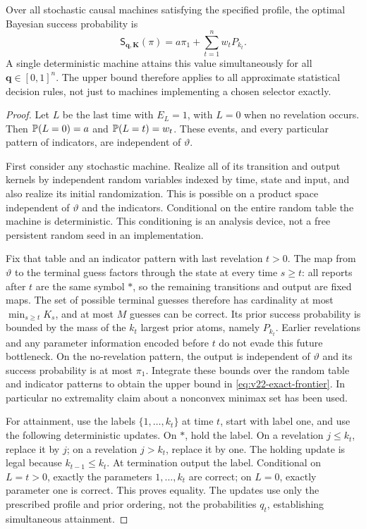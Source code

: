 \begin{theorem}
\label{thm:v22-revelation}
Over all stochastic causal machines satisfying the specified profile,
the optimal Bayesian success probability is
\begin{equation}\label{eq:v22-exact-frontier}
 \mathsf S_{\boldsymbol q,\boldsymbol K}(\pi)
       =a\pi_1+\sum_{t=1}^n w_tP_{k_t}.
\end{equation}
A single deterministic machine attains this value simultaneously for
all $\boldsymbol q\in[0,1]^n$. The upper bound therefore applies to
all approximate statistical decision rules, not just to machines
implementing a chosen selector exactly.
\end{theorem}
\begin{proof}
Let $L$ be the last time with $E_L=1$, with $L=0$ when no revelation
occurs. Then $\mathbb P(L=0)=a$ and $\mathbb P(L=t)=w_t$. These events, and every
particular pattern of indicators, are independent of $\vartheta$.

First consider any stochastic machine. Realize all of its transition
and output kernels by independent random variables indexed by time,
state and input, and also realize its initial randomization. This is
possible on a product space independent of $\vartheta$ and the
indicators. Conditional on the entire random table the machine is
deterministic. This conditioning is an analysis device, not a free
persistent random seed in an implementation.

Fix that table and an indicator pattern with last revelation $t>0$.
The map from $\vartheta$ to the terminal guess factors through the
state at every time $s\ge t$: all reports after $t$ are the same
symbol $*$, so the remaining transitions and output are fixed maps.
The set of possible terminal guesses therefore has cardinality at
most $\min_{s\ge t}K_s$, and at most $M$ guesses can be correct.
Its prior success probability is bounded by the mass of the $k_t$
largest prior atoms, namely $P_{k_t}$. Earlier revelations and any
parameter information encoded before $t$ do not evade this future
bottleneck. On the no-revelation pattern, the output is independent of
$\vartheta$ and its success probability is at most $\pi_1$.
Integrate these bounds over the random table and indicator patterns to
obtain the upper bound in \eqref{eq:v22-exact-frontier}. In particular
no extremality claim about a nonconvex minimax set has been used.

For attainment, use the labels $\{1,\ldots,k_t\}$ at time $t$, start
with label one, and use the following deterministic updates. On $*$,
hold the label. On a revelation $j\le k_t$, replace it by $j$; on a
revelation $j>k_t$, replace it by one. The holding update is legal
because $k_{t-1}\le k_t$. At termination output the label. Conditional
on $L=t>0$, exactly the parameters $1,\ldots,k_t$ are correct; on
$L=0$, exactly parameter one is correct. This proves equality. The
updates use only the prescribed profile and prior ordering, not the
probabilities $q_t$, establishing simultaneous attainment.
\end{proof}

